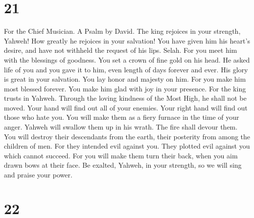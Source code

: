 \hypertarget{section-20}{%
\section{21}\label{section-20}}

For the Chief Musician. A Psalm by David.  The king
rejoices in your strength, Yahweh! How greatly he rejoices in your
salvation!  You have given him his heart's desire, and
have not withheld the request of his lips. Selah.  For you
meet him with the blessings of goodness. You set a crown of fine gold on
his head.  He asked life of you and you gave it to him,
even length of days forever and ever.  His glory is great
in your salvation. You lay honor and majesty on him.  For
you make him most blessed forever. You make him glad with joy in your
presence.  For the king trusts in Yahweh. Through the
loving kindness of the Most High, he shall not be moved. 
Your hand will find out all of your enemies. Your right hand will find
out those who hate you.  You will make them as a fiery
furnace in the time of your anger. Yahweh will swallow them up in his
wrath. The fire shall devour them.  You will destroy
their descendants from the earth, their posterity from among the
children of men.  For they intended evil against you.
They plotted evil against you which cannot succeed.  For
you will make them turn their back, when you aim drawn bows at their
face.  Be exalted, Yahweh, in your strength, so we will
sing and praise your power.

\hypertarget{section-21}{%
\section{22}\label{section-21}}

